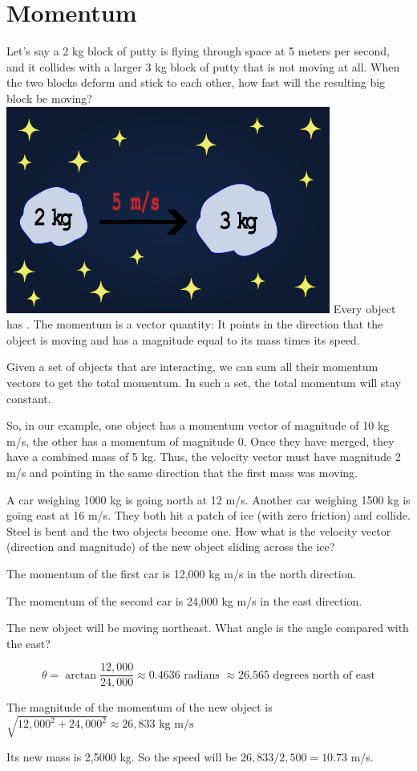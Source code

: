 \chapter{Momentum}

Let's say a 2 kg block of putty is flying through space at 5 meters
per second, and it collides with a larger 3 kg block of putty that is not
moving at all. When the two blocks deform and stick to each other, how
fast will the resulting big block be moving?
\includegraphics[width=0.8\textwidth]{Space_Putty.png}
Every object has .  The momentum is a vector
quantity: It points in the direction that the object is moving and has
a magnitude equal to its mass times its speed.

Given a set of objects that are interacting, we can sum all their
momentum vectors to get the total momentum.  In such a set, the total
momentum will stay constant.

So, in our example, one object has a momentum vector of magnitude of
10 kg m/s, the other has a momentum of magnitude 0.  Once they have
merged, they have a combined mass of 5 kg.  Thus, the velocity vector
must have magnitude 2 m/s and pointing in the same direction that the
first mass was moving.

\begin{Exercise}[title={Cars on Ice}, label=cars_on_ice]
A car weighing 1000 kg is going north at 12 m/s.  Another car weighing
1500 kg is going east at 16 m/s.  They both hit a patch of ice (with
zero friction) and collide.  Steel is bent and the two objects become
one.  How what is the velocity vector (direction and magnitude) of the
new object sliding across the ice?
\end{Exercise}
\begin{Answer}[ref=cars_on_ice]
  The momentum of the first car is 12,000 kg m/s in the north direction.

  The momentum of the second car is 24,000 kg m/s in the east direction.

  The new object will be moving northeast. What angle is the angle compared with the east?

  $$\theta = \arctan{\frac{12,000}{24,000}} \approx 0.4636 \text{ radians } \approx 26.565\text{ degrees north of east}$$

  The magnitude of the momentum of the new object is $\sqrt{12,000^2 + 24,000^2} \approx 26,833\text{ kg m/s}$

  Its new mass is 2,5000 kg.  So the speed will be $26,833/2,500 = 10.73$ m/s.
\end{Answer}


